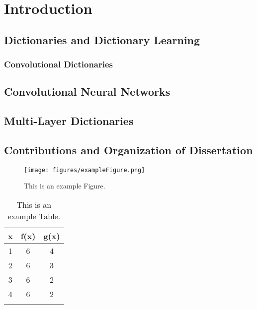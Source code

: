 \chapter{Introduction}


\section{Dictionaries and Dictionary Learning}


\subsection{Convolutional Dictionaries}

\section{Convolutional Neural Networks}

\section{Multi-Layer Dictionaries}

\section{Contributions and Organization of Dissertation}


\begin{figure}
	\texttt{[image: figures/exampleFigure.png]}
	\caption{This is an example Figure.}
	\label{Figure in Chapter 1}
\end{figure}



\begin{table}
\caption{This is an example Table.}
\begin{center}
\begin{tabular}{ccc}
x & f(x) & g(x) \\
\hline
1 & 6 & 4  \\
2 & 6 & 3  \\
3 & 6 & 2  \\
4 & 6 & 2  \\
\label{Table in Chapter 1}
\end{tabular}
\end{center}
\end{table}
